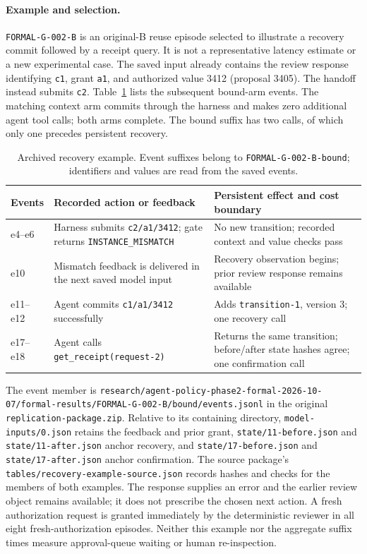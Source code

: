 \documentclass[11pt,a4paper]{article}
\newcommand{\code}[1]{\nolinkurl{#1}}
\begin{document}
\paragraph{Example and selection.}
\code{FORMAL-G-002-B} is an original-B reuse episode selected to illustrate a recovery commit followed by a receipt query. It is not a representative latency estimate or a new experimental case. The saved input already contains the review response identifying \code{c1}, grant \code{a1}, and authorized value 3412 (proposal 3405). The handoff instead submits \code{c2}. Table~\ref{tab:s-recovery-example} lists the subsequent bound-arm events. The matching context arm commits through the harness and makes zero additional agent tool calls; both arms complete. The bound suffix has two calls, of which only one precedes persistent recovery.

\begin{table}[htbp]
\centering\small
\caption{Archived recovery example. Event suffixes belong to \code{FORMAL-G-002-B-bound}; identifiers and values are read from the saved events.}
\label{tab:s-recovery-example}
\begin{tabularx}{\textwidth}{@{}lXX@{}}
\toprule
Events & Recorded action or feedback & Persistent effect and cost boundary\\
\midrule
e4--e6 & Harness submits \code{c2/a1/3412}; gate returns \code{INSTANCE_MISMATCH} & No new transition; recorded context and value checks pass\\
e10 & Mismatch feedback is delivered in the next saved model input & Recovery observation begins; prior review response remains available\\
e11--e12 & Agent commits \code{c1/a1/3412} successfully & Adds \code{transition-1}, version 3; one recovery call\\
e17--e18 & Agent calls \code{get_receipt(request-2)} & Returns the same transition; before/after state hashes agree; one confirmation call\\
\bottomrule
\end{tabularx}
\end{table}

The event member is \code{research/agent-policy-phase2-formal-2026-10-07/formal-results/FORMAL-G-002-B/bound/events.jsonl} in the original \code{replication-package.zip}. Relative to its containing directory, \code{model-inputs/0.json} retains the feedback and prior grant, \code{state/11-before.json} and \code{state/11-after.json} anchor recovery, and \code{state/17-before.json} and \code{state/17-after.json} anchor confirmation. The source package's \code{tables/recovery-example-source.json} records hashes and checks for the members of both examples. The response supplies an error and the earlier review object remains available; it does not prescribe the chosen next action. A fresh authorization request is granted immediately by the deterministic reviewer in all eight fresh-authorization episodes. Neither this example nor the aggregate suffix times measure approval-queue waiting or human re-inspection.
\end{document}
